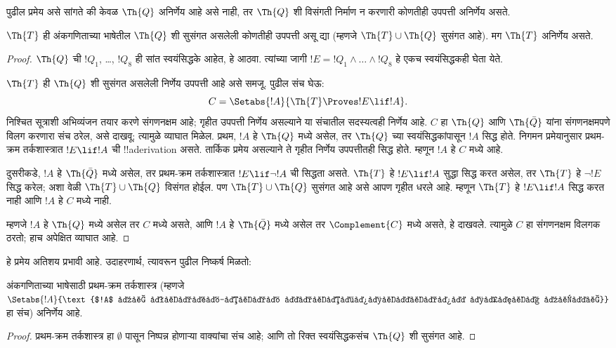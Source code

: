 \documentclass[../../../include/open-logic-section]{subfiles}
\begin{document}


पुढील प्रमेय असे सांगते की केवळ $\Th{Q}$ अनिर्णेय आहे असे नाही,
तर $\Th{Q}$ शी विसंगती निर्माण न करणारी कोणतीही उपपत्ती अनिर्णेय असते.

\begin{thm}
$\Th{T}$ ही अंकगणिताच्या भाषेतील $\Th{Q}$ शी सुसंगत असलेली
कोणतीही उपपत्ती असू द्या (म्हणजे $\Th{T} \cup \Th{Q}$ सुसंगत आहे).
मग $\Th{T}$ अनिर्णेय असते.
\end{thm}

\begin{proof}
$\Th{Q}$ ची $!Q_1$, \dots, $!Q_8$ ही सांत स्वयंसिद्धके आहेत,
हे आठवा. त्यांच्या जागी $!E = !Q_1 \land
\dots \land !Q_8$ हे एकच स्वयंसिद्धकही घेता येते.

$\Th{T}$ ही $\Th{Q}$ शी सुसंगत असलेली निर्णेय उपपत्ती आहे
असे समजू. पुढील संच घेऊ:
\[
C = \Setabs{!A}{\Th{T} \Proves !E \lif !A}.
\]
निश्चित सूत्राशी अभिव्यंजन तयार करणे संगणनक्षम आहे;
गृहीत उपपत्ती निर्णेय असल्याने या संचातील सदस्यत्वही निर्णेय आहे.
$C$ हा $\Th{Q}$ आणि $\Th{\bar Q}$ यांना संगणनक्षमपणे
विलग करणारा संच ठरेल, असे दाखवू; त्यामुळे व्याघात मिळेल.
प्रथम, $!A$ हे $\Th{Q}$ मध्ये असेल, तर $\Th{Q}$ च्या
स्वयंसिद्धकांपासून $!A$ सिद्ध होते. निगमन प्रमेयानुसार
प्रथम-क्रम तर्कशास्त्रात $!E \lif !A$ ची !!a{derivation}
असते. तार्किक प्रमेय असल्याने ते गृहीत निर्णेय उपपत्तीतही सिद्ध होते.
म्हणून $!A$ हे $C$ मध्ये आहे.

दुसरीकडे, $!A$ हे $\Th{\bar Q}$ मध्ये असेल, तर प्रथम-क्रम
तर्कशास्त्रात $!E \lif \lnot !A$ ची सिद्धता असते.
$\Th{T}$ हे $!E \lif !A$ सुद्धा सिद्ध करत असेल, तर
$\Th{T}$ हे $\lnot !E$ सिद्ध करेल; अशा वेळी
$\Th{T} \cup \Th{Q}$ विसंगत होईल. पण
$\Th{T} \cup \Th{Q}$ सुसंगत आहे असे आपण गृहीत धरले आहे.
म्हणून $\Th{T}$ हे $!E \lif !A$ सिद्ध करत नाही आणि $!A$
हे $C$ मध्ये नाही.

म्हणजे $!A$ हे $\Th{Q}$ मध्ये असेल तर $C$ मध्ये असते,
आणि $!A$ हे $\Th{\bar Q}$ मध्ये असेल तर $\Complement{C}$
मध्ये असते, हे दाखवले. त्यामुळे $C$ हा संगणनक्षम विलगक
ठरतो; हाच अपेक्षित व्याघात आहे.
\end{proof}

हे प्रमेय अतिशय प्रभावी आहे. उदाहरणार्थ, त्यावरून पुढील निष्कर्ष मिळतो:

\begin{cor}
  अंकगणिताच्या भाषेसाठी प्रथम-क्रम तर्कशास्त्र (म्हणजे
  $\Setabs{!A}{\text{$!A$ हे प्रथम-क्रम तर्कशास्त्रात सिद्ध होते}}$
  हा संच) अनिर्णेय आहे.
\end{cor}

\begin{proof}
प्रथम-क्रम तर्कशास्त्र हा $\emptyset$ पासून निष्पन्न होणाऱ्या
वाक्यांचा संच आहे; आणि तो रिक्त स्वयंसिद्धकसंच $\Th{Q}$ शी सुसंगत आहे.
\end{proof}
\end{document}
